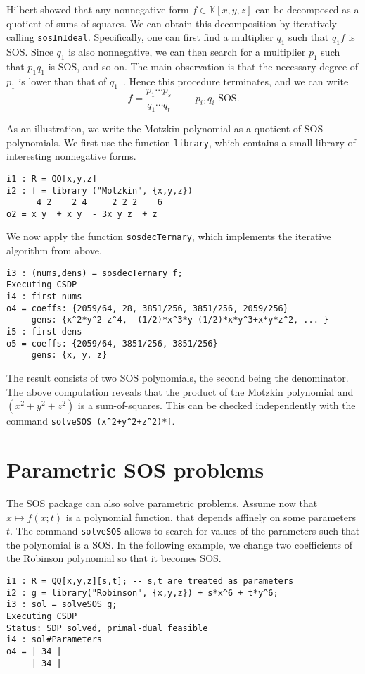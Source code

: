 \documentclass[11pt]{amsart}
\theoremstyle{plain}%
\theoremstyle{definition}
\theoremstyle{remark}
\newcommand{\SOS}{\textsc{SOS}\xspace}
\newcommand{\kk}{\mathbb{K}}
\begin{document}
Hilbert showed that any nonnegative form $f\in \kk[x,y,z]$ can be decomposed as a quotient of sums-of-squares.
We can obtain this decomposition by iteratively calling \verb|sosInIdeal|.
Specifically, one can first find a multiplier $q_{1}$ such that $q_{1}f$ is SOS.
Since $q_1$ is also nonnegative, we can then search for a multiplier $p_{1}$ such that $p_{1}q_{1}$ is SOS, and so on.
The main observation is that the necessary degree of $p_{1}$ is lower than that of $q_{1}$~\cite{de2004products}.
Hence this procedure terminates, and we can write
\[
  f = \frac{p_{1}\cdots p_{s}}{q_{1}\cdots q_{t}} \qquad \text {
    $p_{i},q_{i}$ SOS}.
\]

As an illustration, we write the Motzkin polynomial as a quotient of SOS polynomials.
We first use the function \verb|library|, which contains a small library of interesting nonnegative forms.
{\small
\begin{verbatim}
i1 : R = QQ[x,y,z]
i2 : f = library ("Motzkin", {x,y,z})
      4 2    2 4     2 2 2    6
o2 = x y  + x y  - 3x y z  + z
\end{verbatim}
}
\noindent
We now apply the function \verb|sosdecTernary|, which implements the iterative algorithm from above.
{\small
\begin{verbatim}
i3 : (nums,dens) = sosdecTernary f;
Executing CSDP
i4 : first nums
o4 = coeffs: {2059/64, 28, 3851/256, 3851/256, 2059/256}
     gens: {x^2*y^2-z^4, -(1/2)*x^3*y-(1/2)*x*y^3+x*y*z^2, ... }
i5 : first dens
o5 = coeffs: {2059/64, 3851/256, 3851/256}
     gens: {x, y, z}
\end{verbatim}
}
\noindent
The result consists of two SOS polynomials, the second being the denominator.
The above computation reveals that the product of the Motzkin polynomial and $(x^2{+}y^2{+}z^2)$ is a sum-of-squares.
This can be checked independently with the command \verb|solveSOS (x^2+y^2+z^2)*f|.

\section{Parametric SOS problems}

The \SOS package can also solve parametric problems.
Assume now that $x \mapsto f(x;t)$ is a polynomial function, that depends affinely on some parameters~$t$.
The command \verb|solveSOS| allows to search for values of the parameters such that the polynomial is a SOS.
In the following example, we change two coefficients of the Robinson polynomial so that it becomes SOS.
{\small
\begin{verbatim}
i1 : R = QQ[x,y,z][s,t]; -- s,t are treated as parameters
i2 : g = library("Robinson", {x,y,z}) + s*x^6 + t*y^6;
i3 : sol = solveSOS g;
Executing CSDP
Status: SDP solved, primal-dual feasible
i4 : sol#Parameters
o4 = | 34 |
     | 34 |
\end{verbatim}
}
\end{document}
